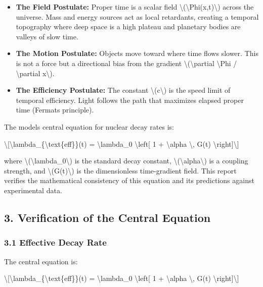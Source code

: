 \documentclass[
  10pt,
]{article}
\providecommand{\tightlist}{%
  \setlength{\itemsep}{0pt}\setlength{\parskip}{0pt}}
\begin{document}
\begin{itemize}
\tightlist
\item
  \textbf{The Field Postulate:} Proper time is a scalar field
  \textbackslash(\textbackslash Phi(x,t)\textbackslash) across the
  universe. Mass and energy sources act as local retardants, creating a
  temporal topography where deep space is a high plateau and planetary
  bodies are valleys of slow time.
\item
  \textbf{The Motion Postulate:} Objects move toward where time flows
  slower. This is not a force but a directional bias from the gradient
  \textbackslash(\textbackslash partial \textbackslash Phi /
  \textbackslash partial x\textbackslash).
\item
  \textbf{The Efficiency Postulate:} The constant
  \textbackslash(c\textbackslash) is the speed limit of temporal
  efficiency. Light follows the path that maximizes elapsed proper time
  (Fermat\textquotesingle s principle).
\end{itemize}

The model\textquotesingle s central equation for nuclear decay rates is:

\textbackslash{[}\textbackslash lambda\_\{\textbackslash text\{eff\}\}(t)
= \textbackslash lambda\_0 \textbackslash left{[} 1 +
\textbackslash alpha \textbackslash, G(t)
\textbackslash right{]}\textbackslash{]}

where \textbackslash(\textbackslash lambda\_0\textbackslash) is the
standard decay constant,
\textbackslash(\textbackslash alpha\textbackslash) is a coupling
strength, and \textbackslash(G(t)\textbackslash) is the dimensionless
time-gradient field. This report verifies the mathematical consistency
of this equation and its predictions against experimental data.

\hypertarget{verification-of-the-central-equation}{%
\subsection{3. Verification of the Central
Equation}\label{verification-of-the-central-equation}}

\hypertarget{effective-decay-rate}{%
\subsubsection{3.1 Effective Decay Rate}\label{effective-decay-rate}}

The central equation is:

\textbackslash{[}\textbackslash lambda\_\{\textbackslash text\{eff\}\}(t)
= \textbackslash lambda\_0 \textbackslash left{[} 1 +
\textbackslash alpha \textbackslash, G(t)
\textbackslash right{]}\textbackslash{]}
\end{document}
